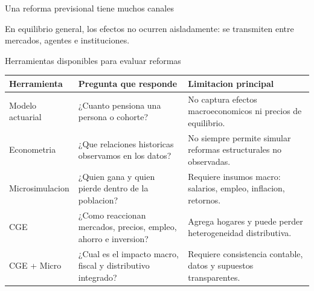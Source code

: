 \documentclass[10pt,aspectratio=169]{beamer}
\begin{document}
\begin{frame}{Una reforma previsional tiene muchos canales}
\centering
{}

\vspace{0.2cm}
\small En equilibrio general, los efectos no ocurren aisladamente: se transmiten entre mercados, agentes e instituciones.
\end{frame}

\begin{frame}{Herramientas disponibles para evaluar reformas}
\centering
\small
\begin{tabular}{p{3.0cm} p{4.3cm} p{4.8cm}}
\toprule
\textbf{Herramienta} & \textbf{Pregunta que responde} & \textbf{Limitacion principal} \\
\midrule
Modelo actuarial & ¿Cuanto pensiona una persona o cohorte? & No captura efectos macroeconomicos ni precios de equilibrio. \\
\addlinespace
Econometria & ¿Que relaciones historicas observamos en los datos? & No siempre permite simular reformas estructurales no observadas. \\
\addlinespace
Microsimulacion & ¿Quien gana y quien pierde dentro de la poblacion? & Requiere insumos macro: salarios, empleo, inflacion, retornos. \\
\addlinespace
CGE & ¿Como reaccionan mercados, precios, empleo, ahorro e inversion? & Agrega hogares y puede perder heterogeneidad distributiva. \\
\addlinespace
CGE + Micro & ¿Cual es el impacto macro, fiscal y distributivo integrado? & Requiere consistencia contable, datos y supuestos transparentes. \\
\bottomrule
\end{tabular}
\end{frame}
\end{document}
